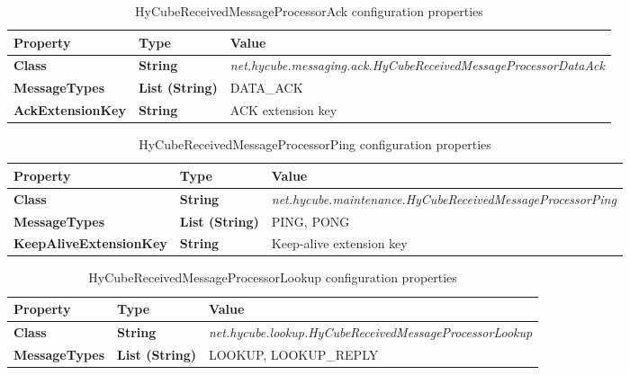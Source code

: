 \begin{table}
\scriptsize
\begin{center}
\begin{tabular}{p{4.5cm} p{1.5cm} p{8.5cm}}
	\hline
	\textbf{Property}							& \textbf{Type}					& \textbf{Value}					\\[1mm]
    \hline
	\textbf{Class}								& \textbf{String}				& \textit{net.hycube.messaging.ack.HyCubeReceivedMessageProcessorDataAck}								\\[1.5mm]	
	\textbf{MessageTypes}						& \textbf{List (String)}		& DATA\_ACK																								\\[1.5mm]	
	\textbf{AckExtensionKey}					& \textbf{String}				& ACK extension key																						\\[1.5mm]	
    \hline
\end{tabular}
\end{center}
\caption{HyCubeReceivedMessageProcessorAck configuration properties}
\label{tab:libHyCubeReceivedMessageProcessorAck}
\end{table}

\begin{table}
\scriptsize
\begin{center}
\begin{tabular}{p{4.5cm} p{1.5cm} p{8.5cm}}
	\hline
	\textbf{Property}							& \textbf{Type}					& \textbf{Value}					\\[1mm]
    \hline
	\textbf{Class}								& \textbf{String}				& \textit{net.hycube.maintenance.HyCubeReceivedMessageProcessorPing}								\\[1.5mm]	
	\textbf{MessageTypes}						& \textbf{List (String)}		& PING, PONG																						\\[1.5mm]	
	\textbf{KeepAliveExtensionKey}					& \textbf{String}			& Keep-alive extension key																			\\[1.5mm]	
    \hline
\end{tabular}
\end{center}
\caption{HyCubeReceivedMessageProcessorPing configuration properties}
\label{tab:libHyCubeReceivedMessageProcessorPing}
\end{table}

\begin{table}
\scriptsize
\begin{center}
\begin{tabular}{p{4.5cm} p{1.5cm} p{8.5cm}}
	\hline
	\textbf{Property}							& \textbf{Type}					& \textbf{Value}					\\[1mm]
    \hline
	\textbf{Class}								& \textbf{String}				& \textit{net.hycube.lookup.HyCubeReceivedMessageProcessorLookup}									\\[1.5mm]	
	\textbf{MessageTypes}						& \textbf{List (String)}		& LOOKUP, LOOKUP\_REPLY																				\\[1.5mm]	
    \hline
\end{tabular}
\end{center}
\caption{HyCubeReceivedMessageProcessorLookup configuration properties}
\label{tab:libHyCubeReceivedMessageProcessorLookup}
\end{table}

